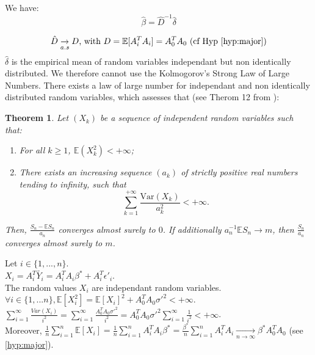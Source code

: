 We have:
\[
\hat{\beta} = \hat{D} ^{-1} \hat{\delta}
\]

\[
\hat{D}  \underset{a.s}{\rightarrow} D \text{,  with } D = \mathbb{E}[A_i^T A_i ] = A_0^T A_0 \text{ (cf Hyp \ref{hyp:major})}
\]
$\hat{\delta}$ is the empirical mean of random variables independant but non identically distributed. 
We therefore cannot use the Kolmogorov's Strong Law of Large Numbers. 
There exists a law of large number for independant and non identically distributed random variables, which assesses that (see Therom 12 from \cite{suquet2004lois}):




\theoremstyle{plain}
\newtheorem{theorem}{Theorem}

\begin{theorem}
    \label{thm:1}
    Let $(X_k)$ be a sequence of independent random variables such that:
    \begin{enumerate}
        \item For all $k \geq 1$, $\mathbb{E}(X_k^2) < +\infty$;
        \item There exists an increasing sequence $(a_k)$ of strictly positive real numbers tending to infinity, such that
        \[
        \sum_{k=1}^{+\infty} \frac{\mathrm{Var}(X_k)}{a_k^2} < +\infty.
        \]
    \end{enumerate}
    Then, $\frac{S_n - \mathbb{E}S_n}{a_n}$ converges almost surely to $0$. If additionally $a_n^{-1} \mathbb{E}S_n \to m$, then $\frac{S_n}{a_n}$ converges almost surely to $m$.\\[2cm]
\end{theorem}

Let $ i \in \{1, ..., n\}$.\\[0.2cm]
$X_i = A_i ^T \tilde{Y_i} = A_i^T A_i \beta^* + A_i ^T \epsilon'_i$. \\
The random values $X_i$ are independant random variables.\\
$\forall i \in \{ 1, ...  n \}, \mathbb{E}[X_i^2] = \mathbb{E}[X_i] ^2 + A_0 ^T A_0 \sigma'^2 < + \infty $.\\

$\sum_{i=1}^{\infty } \frac{Var(X_i)}{i^2} = \sum_{i=1}^{\infty } \frac{A_0^T A_0 \sigma'^2}{i^2} =  A_0^T A_0 \sigma'^2 \sum_{i=1}^{\infty } \frac{1}{i^2} < + \infty$.\\

Moreover,  $\frac{1}{n} \sum_{i=1}^{n} \mathbb{E}[X_i] =\frac{1}{n} \sum_{i=1}^{n} A_i^T A_i \beta^* = \frac{\beta^*}{n} \sum_{i=1}^{n} A_i^T A_i \underset{n\rightarrow \infty}{\rightarrow} \beta ^*  A_0 ^T A_0 $ (see \ref{hyp:major}).\\

